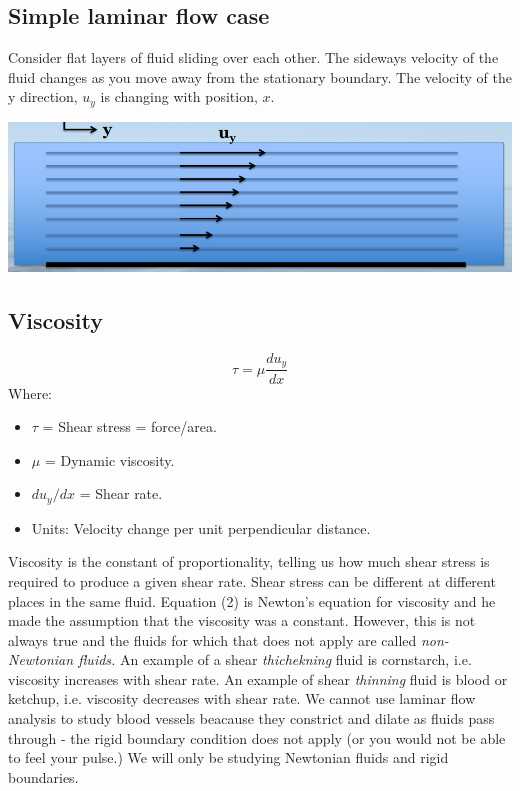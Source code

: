 \documentclass[class=report, crop=false, 12pt,a4paper]{standalone}
\begin{document}
\subsection{Simple laminar flow case}
Consider flat layers of fluid sliding over each other. The sideways velocity of the fluid changes as you move away from the stationary boundary. The velocity of the y direction, \( u_y \) is changing with position, \( x\). 

\begin{center}
  \includegraphics[width = 1 \textwidth]{../img/LaminarFlowSimple}
\end{center}

\subsection{Viscosity}
\begin{equation}
  \tau = \mu \frac{du_y}{dx}
\end{equation}
Where:
\begin{multicols}{2}
  \begin{itemize}[noitemsep]
    \item \(\tau \) = Shear stress = force/area.
    \item \(\mu \) = Dynamic viscosity.
    \item \( du_y / dx \) = Shear rate.
    \item Units: Velocity change per unit perpendicular distance.
  \end{itemize}
\end{multicols}
Viscosity is the constant of proportionality, telling us how much shear stress is required to produce a given shear rate. Shear stress can be different at different places in the same fluid. Equation (2) is Newton's equation for viscosity and he made the assumption that the viscosity was a constant. However, this is not always true and the fluids for which that does not apply are called \emph{non-Newtonian fluids.} An example of a shear \emph{thichekning} fluid is cornstarch, i.e. viscosity increases with shear rate. An example of shear \emph{thinning} fluid is blood or ketchup, i.e. viscosity decreases with shear rate. We cannot use laminar flow analysis to study blood vessels beacause they constrict and dilate as fluids pass through - the rigid boundary condition does not apply (or you would not be able to feel your pulse.) We will only be studying Newtonian fluids and rigid boundaries.
\end{document}
